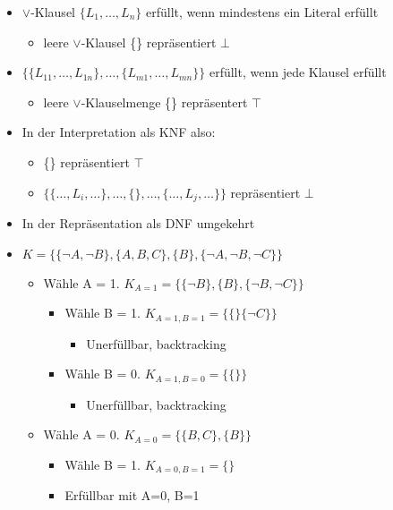 \documentclass{scrartcl}
\begin{document}
\begin{itemize}
	\item $\vee$-Klausel $\{ L_1, \ldots, L_n \}$ erfüllt, wenn mindestens ein Literal erfüllt
	\begin{itemize}
		\item leere $\vee$-Klausel \{\} repräsentiert $\bot$
	\end{itemize}
	\item $\{ \{ L_{11}, \ldots, L_{1n} \}, \ldots, \{ L_{m1}, \ldots, L_{mn} \} \}$ erfüllt, wenn jede Klausel erfüllt
	\begin{itemize}
		\item leere $\vee$-Klauselmenge \{\} repräsentert $\top$
	\end{itemize}
	\item In der Interpretation als KNF also:
	\begin{itemize}
		\item \{\} repräsentiert $\top$
		\item $\{ \{ \ldots, L_i, \ldots \}, \ldots, \{\}, \ldots, \{ \ldots, L_j, \ldots \} \}$ repräsentiert $\bot$
	\end{itemize}
	\item In der Repräsentation als DNF umgekehrt
\end{itemize}

\begin{itemize}
	\item $K = \{ \{ \neg A, \neg B \}, \{ A, B, C \}, \{ B \}, \{ \neg A, \neg B, \neg C \} \}$
	\begin{itemize}
		\item Wähle A = 1. $K_{A=1} = \{ \{ \neg B \}, \{ B \}, \{ \neg B, \neg C \} \}$
		\begin{itemize}
			\item Wähle B = 1. $K_{A=1,B=1} = \{ \{\} \{ \neg C \} \}$
			\begin{itemize}
				\item Unerfüllbar, backtracking
			\end{itemize}
			\item Wähle B = 0. $K_{A=1,B=0} = \{\{\}\}$
			\begin{itemize}
				\item Unerfüllbar, backtracking
			\end{itemize}
		\end{itemize}
		\item Wähle A = 0. $K_{A=0} = \{ \{ B, C \}, \{ B \} \}$
		\begin{itemize}
			\item Wähle B = 1. $K_{A=0,B=1} = \{\}$
			\item Erfüllbar mit A=0, B=1
		\end{itemize}
	\end{itemize}
\end{itemize}
\end{document}
